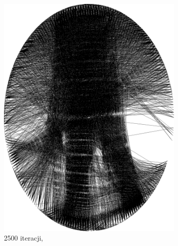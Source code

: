 \documentclass[a4paper, 12pt, polish, twoside]{extreport}
\begin{document}
\begin{figure}[H]
\begin{subfigure}{0.19\textwidth}
            \includegraphics[width = \textwidth]{img/2-theory/aldrin/030mask-aldrin_ellipse_2500_threaded.png}
            \caption{2500 iteracji, }
            \label{przyklad-aldrin-m}
        \end{subfigure}
        \begin{subfigure}{0.19\textwidth}
            \centering

\end{subfigure}
\end{figure}
\end{document}
